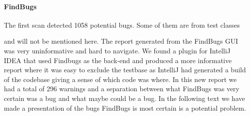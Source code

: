 \documentclass{report} %
\begin{document}
\paragraph{FindBugs}

  The first scan detected 1058 potential bugs. Some of them are from test classes

  and will not be mentioned here. The report generated from the FindBugs GUI was
  very uninformative and hard to navigate. We found a plugin for IntelliJ IDEA
  that used Findbugs as the back-end and produced a more informative report
  where it was easy to exclude the testbase as IntelliJ had generated a build of the
  codebase giving a sense of which code was where. In this new report we
  had a total of 296 warnings and a separation between what FindBugs was very
  certain was a bug and what maybe could be a bug. In the following text we have
  made a presentation of the bugs FindBugs is most certain is a potential
  problem.
\end{document}
